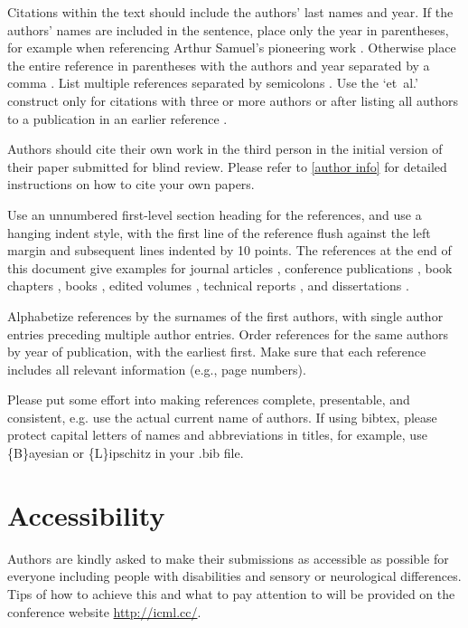 \documentclass{article}
\theoremstyle{plain}
\theoremstyle{definition}
\theoremstyle{remark}
\begin{document}
Citations within the text should include the authors' last names and
year. If the authors' names are included in the sentence, place only
the year in parentheses, for example when referencing Arthur Samuel's
pioneering work . Otherwise place the entire
reference in parentheses with the authors and year separated by a
comma \cite{Samuel59}. List multiple references separated by
semicolons \cite{kearns89,Samuel59,mitchell80}. Use the `et~al.'
construct only for citations with three or more authors or after
listing all authors to a publication in an earlier reference \cite{MachineLearningI}.

Authors should cite their own work in the third person
in the initial version of their paper submitted for blind review.
Please refer to \cref{author info} for detailed instructions on how to
cite your own papers.

Use an unnumbered first-level section heading for the references, and use a
hanging indent style, with the first line of the reference flush against the
left margin and subsequent lines indented by 10 points. The references at the
end of this document give examples for journal articles \cite{Samuel59},
conference publications \cite{langley00}, book chapters \cite{Newell81}, books
\cite{DudaHart2nd}, edited volumes \cite{MachineLearningI}, technical reports
\cite{mitchell80}, and dissertations \cite{kearns89}.

Alphabetize references by the surnames of the first authors, with
single author entries preceding multiple author entries. Order
references for the same authors by year of publication, with the
earliest first. Make sure that each reference includes all relevant
information (e.g., page numbers).

Please put some effort into making references complete, presentable, and
consistent, e.g. use the actual current name of authors.
If using bibtex, please protect capital letters of names and
abbreviations in titles, for example, use \{B\}ayesian or \{L\}ipschitz
in your .bib file.

\section*{Accessibility}
Authors are kindly asked to make their submissions as accessible as possible for everyone including people with disabilities and sensory or neurological differences.
Tips of how to achieve this and what to pay attention to will be provided on the conference website \url{http://icml.cc/}.
\end{document}
